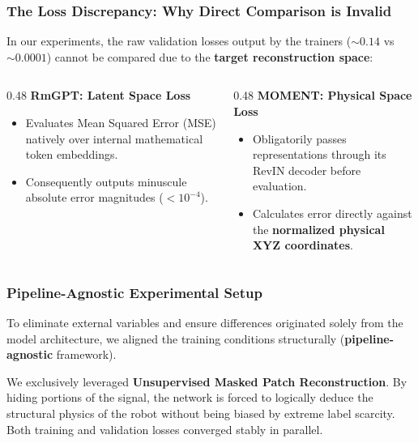 \documentclass[10pt, aspectratio=169]{beamer}
\begin{document}
\begin{frame}
    \frametitle{The Loss Discrepancy: Why Direct Comparison is Invalid}
    In our experiments, the raw validation losses output by the trainers ($\sim 0.14$ vs $\sim 0.0001$) cannot be compared due to the \textbf{target reconstruction space}:
    \vspace{0.3cm}
    \begin{columns}[T]
        \begin{column}{0.48\textwidth}
            \textbf{RmGPT: Latent Space Loss}
            \begin{itemize}
                \item Evaluates Mean Squared Error (MSE) natively over internal mathematical token embeddings.
                \item Consequently outputs minuscule absolute error magnitudes ($<10^{-4}$).
            \end{itemize}
        \end{column}
        \hfill
        \begin{column}{0.48\textwidth}
            \textbf{MOMENT: Physical Space Loss}
            \begin{itemize}
                \item Obligatorily passes representations through its RevIN decoder before evaluation.
                \item Calculates error directly against the \textbf{normalized physical XYZ coordinates}.
            \end{itemize}
        \end{column}
    \end{columns}
\end{frame}

\begin{frame}
    \frametitle{Pipeline-Agnostic Experimental Setup}
    To eliminate external variables and ensure differences originated solely from the model architecture, we aligned the training conditions structurally (\textbf{pipeline-agnostic} framework). 
    
    \vspace{0.2cm}
    We exclusively leveraged \textbf{Unsupervised Masked Patch Reconstruction}. By hiding portions of the signal, the network is forced to logically deduce the structural physics of the robot without being biased by extreme label scarcity. Both training and validation losses converged stably in parallel.
\end{frame}
\end{document}
